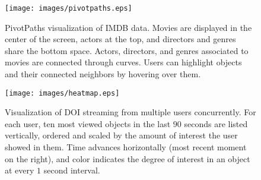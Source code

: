 \begin{figure}[htb]
  \centering
  \texttt{[image: images/pivotpaths.eps]}%
  \caption{PivotPaths visualization of IMDB data. Movies are displayed in the center of the screen, actors at the top, and directors and genres share the bottom space. Actors, directors, and genres associated to movies are connected through curves. Users can highlight objects and their connected neighbors by hovering over them.}
	\label{fig:pivotpaths}
\end{figure}

\begin{figure}[htb]
  \centering
  \texttt{[image: images/heatmap.eps]}%
  \caption{Visualization of DOI streaming from multiple users concurrently. For each user, ten most viewed objects in the last $90$ seconds are listed vertically, ordered and scaled by the amount of interest the user showed in them. Time advances horizontally (most recent moment on the right), and color indicates the degree of interest in an object at every $1$ second interval.}
	\label{fig:heatmap}
\end{figure}


